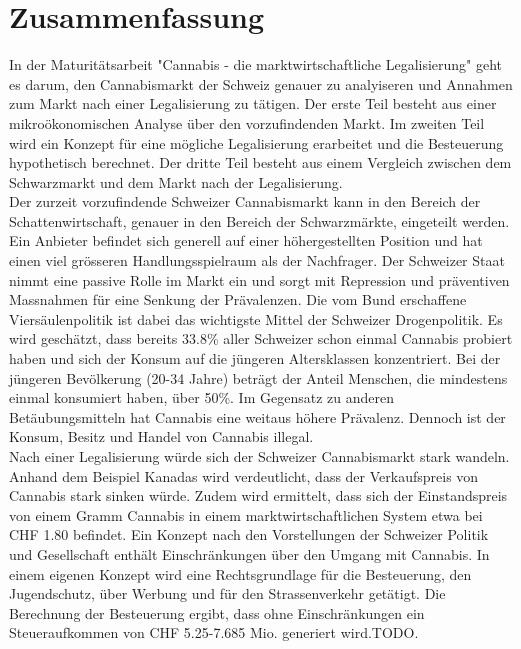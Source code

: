 \documentclass[../main.tex]{subfiles}
\begin{document}
	
	\section{Zusammenfassung}
	
	In der Maturitätsarbeit "Cannabis - die marktwirtschaftliche Legalisierung" geht es darum, den Cannabismarkt der Schweiz genauer zu analyiseren und Annahmen zum Markt nach einer Legalisierung zu tätigen.
	Der erste Teil besteht aus einer mikroökonomischen Analyse über den vorzufindenden Markt.
	Im zweiten Teil wird ein Konzept für eine mögliche Legalisierung erarbeitet und die Besteuerung hypothetisch berechnet.
	Der dritte Teil besteht aus einem Vergleich zwischen dem Schwarzmarkt und dem Markt nach der Legalisierung.\\
	
	\noindent
	Der zurzeit vorzufindende Schweizer Cannabismarkt kann in den Bereich der Schattenwirtschaft, genauer in den Bereich der Schwarzmärkte, eingeteilt werden.
	Ein Anbieter befindet sich generell auf einer höhergestellten Position und hat einen viel grösseren Handlungsspielraum als der Nachfrager.
	Der Schweizer Staat nimmt eine passive Rolle im Markt ein und sorgt mit Repression und präventiven Massnahmen für eine Senkung der Prävalenzen.
	Die vom Bund erschaffene Viersäulenpolitik ist dabei das wichtigste Mittel der Schweizer Drogenpolitik.
	Es wird geschätzt, dass bereits 33.8\% aller Schweizer schon einmal Cannabis probiert haben und sich der Konsum auf die jüngeren Altersklassen konzentriert.
	Bei der jüngeren Bevölkerung (20-34 Jahre) beträgt der Anteil Menschen, die mindestens einmal konsumiert haben, über 50\%.
	Im Gegensatz zu anderen Betäubungsmitteln hat Cannabis eine weitaus höhere Prävalenz.
	Dennoch ist der Konsum, Besitz und Handel von Cannabis illegal.\\
	
	\noindent
	Nach einer Legalisierung würde sich der Schweizer Cannabismarkt stark wandeln.
	Anhand dem Beispiel Kanadas wird verdeutlicht, dass der Verkaufspreis von Cannabis stark sinken würde.
	Zudem wird ermittelt, dass sich der Einstandspreis von einem Gramm Cannabis in einem marktwirtschaftlichen System etwa bei CHF 1.80 befindet.
	Ein Konzept nach den Vorstellungen der Schweizer Politik und Gesellschaft enthält Einschränkungen über den Umgang mit Cannabis.
	In einem eigenen Konzept wird eine Rechtsgrundlage für die Besteuerung, den Jugendschutz, über Werbung und für den Strassenverkehr getätigt.
	Die Berechnung der Besteuerung ergibt, dass ohne Einschränkungen ein Steueraufkommen von CHF 5.25-7.685 Mio. generiert wird.TODO.
	
	
\end{document}
